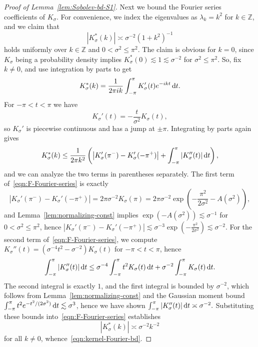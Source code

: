 \documentclass[preprint]{imsart}
\theoremstyle{plain}
\theoremstyle{definition}
\newcommand{\Zbb}{\mathbb{Z}}
\newcommand{\diff}{\textnormal{d}}
\begin{document}
\begin{appendix}
\begin{proof}[Proof of Lemma~\ref{lem:Sobolev-bd-S1}]
Next we bound the Fourier series coefficients of $K_{\sigma}$.
For convenience, we index the eigenvalues as $\lambda_k=k^2$ for $k\in\Zbb$, and we claim that
\begin{equation}\label{eqn:kernel-Fourier-bd}
    |K^{\ast}_\sigma(k)|\asymp \sigma^{-2}(1+k^2)^{-1}
\end{equation}
holds uniformly over $k\in\Zbb$ and $0<\sigma^2\le \pi^2$.
The claim is obvious for $k=0$, since $K_{\sigma}$ being a probability density implies $K_{\sigma}^{\ast}(0) \lesssim 1 \lesssim \sigma^{-2}$ for $\sigma^2\le \pi^2$.
So, fix $k\neq 0$, and use integration by parts to get
\[
K_\sigma^{\ast}(k)
=
\frac{1}{2\pi ik}\int_{-\pi}^{\pi}K_\sigma'(t)e^{-ikt}\,\diff t.
\]
For $-\pi<t<\pi$ we have
\[
K_\sigma'(t)=-\frac{t}{\sigma^2}K_\sigma(t),
\]
so $K_\sigma'$ is piecewise continuous and has a jump at $\pm\pi$.
Integrating by parts again gives
\begin{equation}\label{eqn:F-Fourier-series}
K_\sigma^{\ast}(k)
\le
\frac{1}{2\pi k^2}
\left(
\bigl|K_\sigma'(\pi^-)-K_\sigma'(-\pi^+)\bigr|
+
\int_{-\pi}^{\pi}|K_\sigma''(t)|\,\diff t
\right),
\end{equation}
and we can analyze the two terms in parentheses separately.
The first term of~\eqref{eqn:F-Fourier-series} is exactly
\[
|K_\sigma'(\pi^-)-K_\sigma'(-\pi^+)|
=
2\pi\sigma^{-2}K_\sigma(\pi)
=
2\pi\sigma^{-2}\exp\left(-\frac{\pi^2}{2\sigma^2}-A(\sigma^2)\right),
\]
and Lemma~\ref{lem:normalizing-const} implies
$\exp(-A(\sigma^2))\lesssim \sigma^{-1}$ for $0<\sigma^2\le \pi^2$, hence $|K_\sigma'(\pi^-)-K_\sigma'(-\pi^+)|\lesssim
\sigma^{-3}\exp(-\frac{\pi^2}{2\sigma^2})
\lesssim
\sigma^{-2}$.
For the second term of~\eqref{eqn:F-Fourier-series}, we compute $K_\sigma''(t)=(\sigma^{-4}t^2-\sigma^{-2})K_\sigma(t)$ for $-\pi<t<\pi$,
hence
\[
\int_{-\pi}^{\pi}|K_\sigma''(t)|\,\diff t
\le
\sigma^{-4}\int_{-\pi}^{\pi}t^2K_\sigma(t)\,\diff t
+
\sigma^{-2}\int_{-\pi}^{\pi}K_\sigma(t)\,\diff t.
\]
The second integral is exactly $1$, and the first integral is bounded by $\sigma^{-2}$, which follows from Lemma~\ref{lem:normalizing-const} and the
Gaussian moment bound $\int_{-\pi}^{\pi} t^2 e^{-t^2/(2\sigma^2)}\,\diff t \lesssim \sigma^3$, hence we have shown $\int_{-\pi}^{\pi}|K_\sigma''(t)|\,\diff t \asymp \sigma^{-2}.$
Substituting these bounds into~\eqref{eqn:F-Fourier-series} establishes
\[
|K_\sigma^{\ast}(k)|\asymp \sigma^{-2}k^{-2}
\]
for all $k\neq 0$, whence~\eqref{eqn:kernel-Fourier-bd}.


\end{proof}
\end{appendix}
\end{document}
